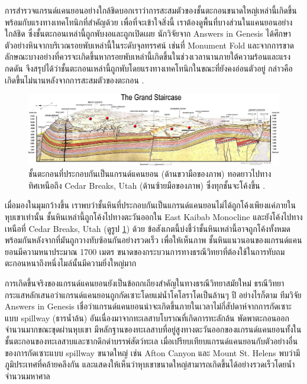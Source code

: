 \documentclass[10pt,twocolumn,letterpaper]{article}
\begin{document}
การสำรวจแกรนด์แคนยอนอย่างใกล้ชิดบอกเราว่าการสะสมตัวของชั้นตะกอนขนาดใหญ่เหล่านี้เกิดขึ้นพร้อมกับแรงทางเทคโทนิกที่สำคัญด้วย เพื่อที่จะเข้าใจสิ่งนี้ เราต้องดูพื้นที่บางส่วนในแคนยอนอย่างใกล้ชิด ซึ่งชั้นตะกอนเหล่านี้ถูกพับงอและถูกเปิดเผย นักวิจัยจาก Answers in Genesis \cite{42} ได้ศึกษาตัวอย่างหินจากบริเวณรอยพับเหล่านี้ในระดับจุลทรรศน์ เช่นที่ Monument Fold และจากการขาดลักษณะบางอย่างที่ควรจะเกิดขึ้นหากรอยพับเหล่านี้เกิดขึ้นในช่วงเวลานานภายใต้ความร้อนและแรงกดดัน จึงสรุปได้ว่าชั้นตะกอนเหล่านี้ถูกพับโดยแรงทางเทคโทนิกในขณะที่ยังคงอ่อนตัวอยู่ กล่าวคือ เกิดขึ้นไม่นานหลังจากการสะสมตัวของตะกอน \cite{43}.

\begin{figure}
\begin{center}
\includegraphics[width=1\textwidth]{Grand_Staircase-big.jpg}
\end{center}
   \caption{ชั้นตะกอนที่ประกอบกันเป็นแกรนด์แคนยอน (ด้านขวามือของภาพ) ทอดยาวไปทางทิศเหนือถึง Cedar Breaks, Utah (ด้านซ้ายมือของภาพ) ซึ่งทุกชั้นจะโค้งขึ้น \cite{50}.}
\label{fig:4}
\end{figure}

เมื่อมองในมุมกว้างขึ้น เราพบว่าชั้นหินที่ประกอบกันเป็นแกรนด์แคนยอนไม่ได้ถูกโค้งเพียงแค่ภายในหุบเขาเท่านั้น ชั้นหินเหล่านี้ถูกโค้งไปทางตะวันออกใน East Kaibab Monocline \cite{46} และยังโค้งไปทางเหนือที่ Cedar Breaks, Utah (ดูรูป \ref{fig:4}) ด้วย ข้อสังเกตนี้บ่งชี้ว่าชั้นหินเหล่านี้อาจถูกโค้งทั้งหมดพร้อมกันหลังจากที่มันถูกวางทับซ้อนกันอย่างรวดเร็ว เพื่อให้เห็นภาพ ชั้นหินแนวนอนของแกรนด์แคนยอนมีความหนาประมาณ 1700 เมตร ขนาดของกระบวนการทางธรณีวิทยาที่ต้องใช้ในการทับถมตะกอนหนาถึงหนึ่งไมล์นั้นมีความยิ่งใหญ่มาก

การเกิดขึ้นจริงของแกรนด์แคนยอนยังเป็นข้อถกเถียงสำคัญในทางธรณีวิทยาสมัยใหม่ ธรณีวิทยากระแสหลักเสนอว่าแกรนด์แคนยอนถูกกัดเซาะโดยแม่น้ำโคโลราโดเป็นล้านๆ ปี \cite{47} อย่างไรก็ตาม ทีมวิจัย Answers in Genesis เชื่อว่าแกรนด์แคนยอนน่าจะเกิดขึ้นภายในเวลาไม่กี่สัปดาห์จากการกัดเซาะแบบ spillway (ธารน้ำล้น) อันเนื่องมาจากทะเลสาบโบราณที่เกิดการทะลักล้น พัดพาตะกอนออกจำนวนมากขณะขุดผ่านหุบเขา มีหลักฐานของทะเลสาบที่อยู่สูงทางตะวันออกของแกรนด์แคนยอนทั้งในชั้นตะกอนของทะเลสาบและซากดึกดำบรรพ์สัตว์ทะเล เมื่อเปรียบเทียบแกรนด์แคนยอนกับตัวอย่างอื่นของการกัดเซาะแบบ spillway ขนาดใหญ่ เช่น Afton Canyon และ Mount St. Helens พบว่ามีภูมิประเทศที่คล้ายคลึงกัน และแสดงให้เห็นว่าหุบเขาขนาดใหญ่สามารถเกิดขึ้นได้อย่างรวดเร็วโดยน้ำจำนวนมหาศาล \cite{48}
\end{document}
